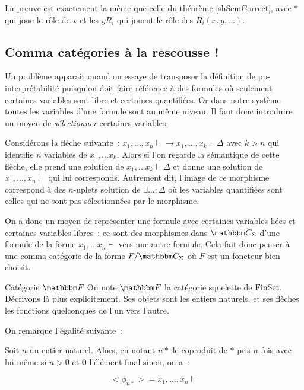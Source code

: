 \begin{pv}
    La preuve est exactement la même que celle du théorème \ref{shSemCorrect},
    avec $\ast$ qui joue le rôle de $\star$ et les $yR_i$ qui jouent le rôle
    des $R_i(x, y, \dots)$.
\end{pv}

\subsection{Comma catégories à la rescousse !}

Un problème apparait quand on essaye de transposer la définition de pp-interprétabilité
puisqu'on doit faire référence à des formules où seulement certaines variables sont
libre et certaines quantifiées. Or dans notre système toutes les variables d'une
formule sont au même niveau. Il faut donc introduire un moyen de \emph{sélectionner}
certaines variables.

Considérons la flèche suivante~:
$x_1,\dots, x_n\vdash \rightarrow x_1,\dots, x_k\vdash\Delta$ avec $k>n$ qui identifie
$n$ variables de $x_1,\dots x_k$. Alors si l'on regarde la sémantique de cette flèche,
elle prend une solution de $x_1,\dots x_k\vdash\Delta$ et donne une solution de
$x_1,\dots, x_n\vdash$ qui lui corresponds. Autrement dit, l'image de ce morphisme
correspond à des $n$-uplets solution de $\exists \dots:\Delta$ où les variables
quantifiées sont celles qui ne sont pas sélectionnées par le morphisme.

On a donc un moyen de représenter une formule avec certaines variables liées et certaines
variables libres~: ce sont des morphismes dans $\C_\Sigma$ d'une formule de la forme
$x_1,\dots x_n\vdash$ vers une autre formule. Cela fait donc penser à une comma
catégorie de la forme $F/\C_\Sigma$ où $F$ est un foncteur bien choisit.

\begin{defi}{Catégorie $\cf$}
    On note $\cf$ la catégorie squelette de $\text{FinSet}$. Décrivons là plus explicitement.
    Ses objets sont les entiers naturels, et ses flèches les fonctions quelconques
    de l'un vers l'autre.
\end{defi}

On remarque l'égalité suivante~:

\begin{lem}
    Soit $n$ un entier naturel. Alors, en notant $n\ast$ le coproduit de $\ast$ pris
    $n$ fois avec lui-même si $n>0$ et $\mathbf{0}$ l'élément final sinon, on
    a~:

    \[ <\phi_{n\ast}> = x_1,\dots, x_n\vdash \]
\end{lem}

